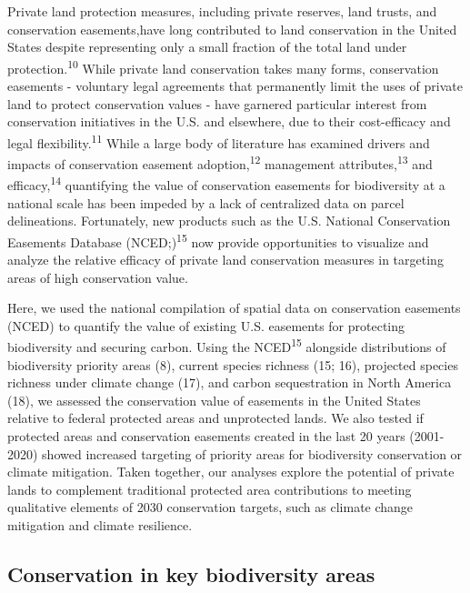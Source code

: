 \documentclass[3p]{elsarticle} %
\begin{document}
Private land protection measures, including private reserves, land
trusts, and conservation easements,have long contributed to land
conservation in the United States despite representing only a small
fraction of the total land under protection.\textsuperscript{10} While
private land conservation takes many forms, conservation easements -
voluntary legal agreements that permanently limit the uses of private
land to protect conservation values - have garnered particular interest
from conservation initiatives in the U.S. and elsewhere, due to their
cost-efficacy and legal flexibility.\textsuperscript{11} While a large
body of literature has examined drivers and impacts of conservation
easement adoption,\textsuperscript{12} management
attributes,\textsuperscript{13} and efficacy,\textsuperscript{14}
quantifying the value of conservation easements for biodiversity at a
national scale has been impeded by a lack of centralized data on parcel
delineations. Fortunately, new products such as the U.S. National
Conservation Easements Database (NCED;)\textsuperscript{15} now provide
opportunities to visualize and analyze the relative efficacy of private
land conservation measures in targeting areas of high conservation
value.

Here, we used the national compilation of spatial data on conservation
easements (NCED) to quantify the value of existing U.S. easements for
protecting biodiversity and securing carbon. Using the
NCED\textsuperscript{15} alongside distributions of biodiversity
priority areas (8), current species richness (15; 16), projected species
richness under climate change (17), and carbon sequestration in North
America (18), we assessed the conservation value of easements in the
United States relative to federal protected areas and unprotected lands.
We also tested if protected areas and conservation easements created in
the last 20 years (2001-2020) showed increased targeting of priority
areas for biodiversity conservation or climate mitigation. Taken
together, our analyses explore the potential of private lands to
complement traditional protected area contributions to meeting
qualitative elements of 2030 conservation targets, such as climate
change mitigation and climate resilience.

\hypertarget{conservation-in-key-biodiversity-areas}{%
\subsection{Conservation in key biodiversity
areas}\label{conservation-in-key-biodiversity-areas}}
\end{document}
